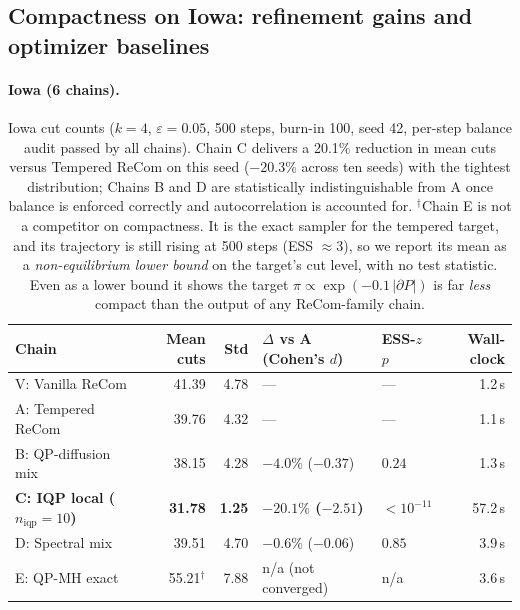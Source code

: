\documentclass[11pt]{article}
\begin{document}
\subsection{Compactness on Iowa: refinement gains and optimizer baselines}\label{sec:exp-compactness}

\paragraph{Iowa (6 chains).}\label{sec:exp-iowa}

\begin{table}[htbp]
\centering
\small
\begin{tabular}{lrrllr}
\toprule
Chain & Mean cuts & Std & $\Delta$ vs A (Cohen's $d$) & ESS-$z$ $p$ & Wall-clock \\
\midrule
V: Vanilla ReCom         & 41.39 & 4.78 & ---                & ---     & 1.2\,s \\
A: Tempered ReCom        & 39.76 & 4.32 & ---                & ---     & 1.1\,s \\
B: QP-diffusion mix      & 38.15 & 4.28 & $-4.0\%$ ($-0.37$) & $0.24$  & 1.3\,s \\
\textbf{C: IQP local ($n_{\mathrm{iqp}} = 10$)}
                         & \textbf{31.78} & \textbf{1.25}
                         & \textbf{$-20.1\%$ ($-2.51$)} & $< 10^{-11}$ & 57.2\,s \\
D: Spectral mix          & 39.51 & 4.70 & $-0.6\%$ ($-0.06$) & $0.85$  & 3.9\,s \\
E: QP-MH exact           & 55.21$^{\dagger}$ & 7.88 & n/a (not converged) & n/a & 3.6\,s \\
\bottomrule
\end{tabular}
\caption{Iowa cut counts ($k = 4$, $\varepsilon = 0.05$, 500 steps,
  burn-in 100, seed 42, per-step balance audit passed by all chains).
  Chain C delivers a 20.1\% reduction in mean cuts versus Tempered
  ReCom on this seed ($-20.3\%$ across ten seeds) with the tightest
  distribution; Chains B and D are
  statistically indistinguishable from A once balance is enforced
  correctly and autocorrelation is accounted for. $^{\dagger}$Chain E
  is not a competitor on compactness. It is the exact sampler for the
  tempered target, and its trajectory is still rising at 500 steps
  (ESS $\approx 3$), so we report its mean as a \emph{non-equilibrium
  lower bound} on the target's cut level, with no test statistic.
  Even as a lower bound it shows the target
  $\pi \propto \exp(-0.1\,|\partial P|)$ is far \emph{less} compact
  than the output of any ReCom-family chain.}\label{tab:iowa-headline}
\end{table}
\end{document}

